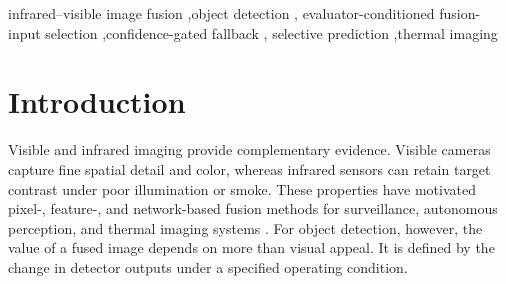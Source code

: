 \documentclass[preprint,11pt]{elsarticle}
\providecommand{\DIFaddtex}[1]{{\protect\color{blue} \sf #1}} %
\providecommand{\DIFdeltex}[1]{{\protect\color{red} \scriptsize #1}} %
\providecommand{\DIFaddbegin}{} %
\providecommand{\DIFaddend}{} %
\providecommand{\DIFdelbegin}{} %
\providecommand{\DIFdelend}{} %
\providecommand{\DIFadd}[1]{\texorpdfstring{\DIFaddtex{#1}}{#1}} %
\providecommand{\DIFdel}[1]{\texorpdfstring{\DIFdeltex{#1}}{}} %
\begin{document}
\begin{frontmatter}
\begin{abstract}
With score depth and margin fixed, a development-set candidate-library
selection chose visible plus PIAFusion. \DIFdelbegin \DIFdel{This }\DIFdelend \DIFaddbegin \DIFadd{On a later 900-frame LLVIP holdout, this
}\DIFaddend two-candidate policy \DIFdelbegin \DIFdel{used two
rather than four detector passes and gained \(+0.00337\)
\([-0.00016,+0.01267]\) }\DIFdelend \DIFaddbegin \DIFadd{gained \(+0.01560\) \([+0.00249,+0.02874]\) }\DIFaddend AP50 \DIFdelbegin \DIFdel{over visible }\DIFdelend and
\DIFdelbegin \DIFdel{\(+0.01218\)
\([+0.00136,+0.02915]\) over no shield on LLVIP. It }\DIFdelend \DIFaddbegin \DIFadd{\(+0.00946\) \([+0.00113,+0.01769]\) AP50--95 over visible input, with positive
gains in all three sequences and six checkpoints. Ungated PIAFusion reversed
strongly on one sequence. The policy }\DIFaddend did not transfer to VEDAI or independent
DroneVehicle runs. \DIFaddbegin \DIFadd{A measured end-to-end pipeline median was \(1.67\) s versus
\(2.52\) s for the full library, still above real time. }\DIFaddend CS-ECF is therefore
supported only as a checkpoint- and domain-specific AP50 safeguard after
independent validation.
\DIFdelbegin \DIFdel{It is not a general accuracy gain, localization-robust safeguard, risk
guarantee, or low-latency deployment method.
}\DIFdelend \end{abstract}

\begin{keyword}
infrared--visible image fusion \sep object detection \sep
evaluator-conditioned fusion-input selection \sep confidence-gated fallback \sep
selective prediction \sep thermal imaging
\end{keyword}

\end{frontmatter}

\section{Introduction}

Visible and infrared imaging provide complementary evidence. Visible cameras
capture fine spatial detail and color, whereas infrared sensors can retain
target contrast under poor illumination or smoke. These properties have
motivated pixel-, feature-, and network-based fusion methods for surveillance,
autonomous perception, and thermal imaging systems
\cite{ma2019survey,mudavath2026review,zhu2017tophat,zhang2020,ma2019fusiongan,li2019densefuse,xu2022u2fusion,li2021rfn,yi2024diffif,yang2025lfdt}.
For object detection, however, the value of a fused image depends on more than
visual appeal. It is defined by the change in detector outputs under a
specified operating condition.
\end{document}
